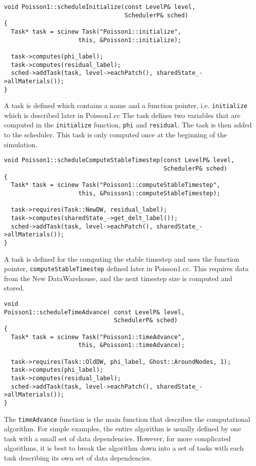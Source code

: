 \documentclass[12pt]{report}
\begin{document}
\begin{verbatim}
void Poisson1::scheduleInitialize(const LevelP& level,
                                  SchedulerP& sched)
{
  Task* task = scinew Task("Poisson1::initialize",
                     this, &Poisson1::initialize);

  task->computes(phi_label);
  task->computes(residual_label);
  sched->addTask(task, level->eachPatch(), sharedState_->allMaterials());
}
\end{verbatim}

A task is defined which contains a name and a function pointer,
i.e. \texttt{initialize} which is described later in Poisson1.cc The
task defines two variables that are computed in the
\texttt{initialize} function, \texttt{phi} and \texttt{residual}.  The
task is then added to the scheduler.  This task is only computed once
at the beginning of the simulation.

\begin{verbatim}
void Poisson1::scheduleComputeStableTimestep(const LevelP& level,
                                             SchedulerP& sched)
{
  Task* task = scinew Task("Poisson1::computeStableTimestep",
                     this, &Poisson1::computeStableTimestep);

  task->requires(Task::NewDW, residual_label);
  task->computes(sharedState_->get_delt_label());
  sched->addTask(task, level->eachPatch(), sharedState_->allMaterials());
}

\end{verbatim}

A task is defined for the computing the stable timestep and uses the
function pointer, \texttt{computeStableTimestep} defined later in
Poisson1.cc.  This requires data from the New DataWarehouse, and the
next timestep size is computed and stored.

\begin{verbatim}
void
Poisson1::scheduleTimeAdvance( const LevelP& level,
                               SchedulerP& sched)
{
  Task* task = scinew Task("Poisson1::timeAdvance",
                     this, &Poisson1::timeAdvance);

  task->requires(Task::OldDW, phi_label, Ghost::AroundNodes, 1);
  task->computes(phi_label);
  task->computes(residual_label);
  sched->addTask(task, level->eachPatch(), sharedState_->allMaterials());
}
\end{verbatim}

The \texttt{timeAdvance} function is the main function that describes
the computational algorithm.  For simple examples, the entire
algorithm is usually defined by one task with a small set of data
dependencies.  However, for more complicated algorithms, it is best to
break the algorithm down into a set of tasks with each task describing
its own set of data dependencies.
\end{document}
